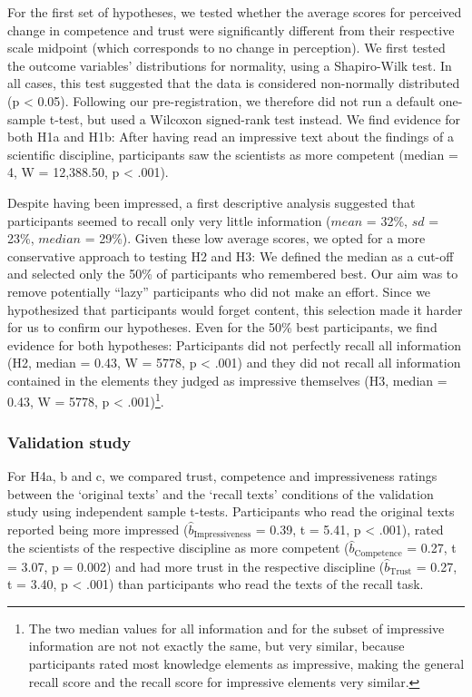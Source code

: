 \documentclass[
  doc,floatsintext]{apa6}
\begin{document}
For the first set of hypotheses, we tested whether the average scores for perceived change in competence and trust were significantly different from their respective scale midpoint (which corresponds to no change in perception). We first tested the outcome variables' distributions for normality, using a Shapiro-Wilk test. In all cases, this test suggested that the data is considered non-normally distributed (p \textless{} 0.05). Following our pre-registration, we therefore did not run a default one-sample t-test, but used a Wilcoxon signed-rank test instead. We find evidence for both H1a and H1b: After having read an impressive text about the findings of a scientific discipline, participants saw the scientists as more competent (median = 4, W = 12,388.50, p \textless{} .001).

Despite having been impressed, a first descriptive analysis suggested that participants seemed to recall only very little information (\(mean\) = 32\%, \(sd\) = 23\%, \(median\) = 29\%). Given these low average scores, we opted for a more conservative approach to testing H2 and H3: We defined the median as a cut-off and selected only the 50\% of participants who remembered best. Our aim was to remove potentially ``lazy'' participants who did not make an effort. Since we hypothesized that participants would forget content, this selection made it harder for us to confirm our hypotheses. Even for the 50\% best participants, we find evidence for both hypotheses: Participants did not perfectly recall all information (H2, median = 0.43, W = 5778, p \textless{} .001) and they did not recall all information contained in the elements they judged as impressive themselves (H3, median = 0.43, W = 5778, p \textless{} .001)\footnote{The two median values for all information and for the subset of impressive information are not not exactly the same, but very similar, because participants rated most knowledge elements as impressive, making the general recall score and the recall score for impressive elements very similar.}.

\subsubsection{Validation study}\label{validation-study-1}

For H4a, b and c, we compared trust, competence and impressiveness ratings between the `original texts' and the `recall texts' conditions of the validation study using independent sample t-tests. Participants who read the original texts reported being more impressed (\(\hat{b}_{\text{Impressiveness}}\) = 0.39, t = 5.41, p \textless{} .001), rated the scientists of the respective discipline as more competent (\(\hat{b}_{\text{Competence}}\) = 0.27, t = 3.07, p = 0.002) and had more trust in the respective discipline (\(\hat{b}_{\text{Trust}}\) = 0.27, t = 3.40, p \textless{} .001) than participants who read the texts of the recall task.
\end{document}

